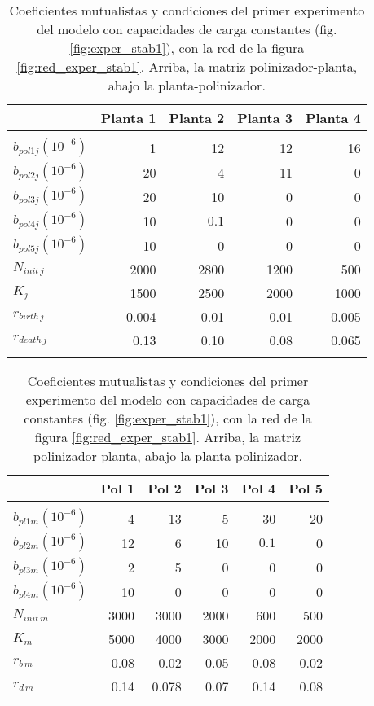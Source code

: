 \begin{table}[h!]
\centering
\footnotesize
\begin{tabular}{lrrrr}
\hline
 & Planta 1 & Planta 2 & Planta 3 & Planta 4  \\
\hline
\\
$b_{pol1j}\left(10^{-6}\right)$ & 1 & 12 & 12 & 16 \\
$b_{pol2j}\left(10^{-6}\right)$ & 20 & 4 & 11 & 0 \\
$b_{pol3j}\left(10^{-6}\right)$ & 20 & 10 & 0 & 0 \\
$b_{pol4j}\left(10^{-6}\right)$ & 10 & $0.1$ & 0 & 0 \\
$b_{pol5j}\left(10^{-6}\right)$ & 10 & 0 & 0 & 0 \\
$N_{init\,j}$ & 2000 & 2800 & 1200 & 500 \\
$K_{j}$ & 1500 & 2500 & 2000 & 1000 \\
$r_{birth\, j}$ & 0.004 & 0.01 & 0.01 & 0.005 \\
$r_{death\, j}$ & 0.13 & 0.10 & 0.08 & 0.065 \\
\hline
\\
\end{tabular}

\begin{tabular}{lrrrrr}
\hline
 &Pol 1&Pol 2&Pol 3&Pol 4&Pol 5\\
\hline
\\
$b_{pl1m}\left(10^{-6}\right)$ & 4 & 13 & 5 & 30 & 20\\
$b_{pl2m}\left(10^{-6}\right)$ & 12 & 6 & 10 & $0.1$ & 0\\
$b_{pl3m}\left(10^{-6}\right)$ & 2 & 5 & 0 & 0 & 0\\
$b_{pl4m}\left(10^{-6}\right)$ & 10 & 0 & 0 & 0 & 0\\
$N_{init\,m}$ & 3000 & 3000 & 2000 & 600 & 500 \\
$K_{m}$& 5000 & 4000 & 3000 & 2000 & 2000\\
$r_{b\, m}$ & 0.08 & 0.02 & 0.05 & 0.08 & 0.02 \\
$r_{d\, m}$ & 0.14 & 0.078 & 0.07 & 0.14 & 0.08 \\
\hline
\end{tabular}
\normalsize
\caption{Coeficientes mutualistas y condiciones del primer experimento del modelo con capacidades de carga constantes (fig. \ref{fig:exper_stab1}), con la red de la figura \ref{fig:red_exper_stab1}. Arriba, la matriz polinizador-planta, abajo la planta-polinizador.}
\label{tab:experiment1}\vspace*{-10pt}
\end{table}

